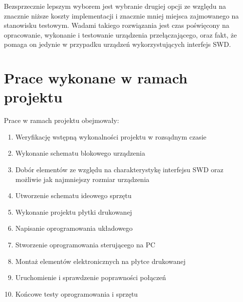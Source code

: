 Bezsprzecznie lepszym wyborem jest wybranie drugiej opcji ze względu na znacznie niższe koszty implementacji i znacznie mniej miejsca zajmowanego na stanowisku testowym. Wadami takiego rozwiązania jest czas poświęcony na opracowanie, wykonanie i testowanie urządzenia przełączającego, oraz fakt, że pomaga on jedynie w przypadku urządzeń wykorzystujących interfejs SWD.

\section{Prace wykonane w ramach projektu}
Prace w ramach projektu obejmowały:
\begin{enumerate}
    \item Weryfikację wstępną wykonalności projektu w rozsądnym czasie
    \item Wykonanie schematu blokowego urządzenia
    \item Dobór elementów ze względu na charakterystykę interfejsu SWD oraz możliwie jak najmniejszy rozmiar urządzenia
    \item Utworzenie schematu ideowego sprzętu
    \item Wykonanie projektu płytki drukowanej
    \item Napisanie oprogramowania układowego
    \item Stworzenie oprogramowania sterującego na PC
    \item Montaż elementów elektronicznych na płytce drukowanej
    \item Uruchomienie i sprawdzenie poprawności połączeń
    \item Końcowe testy oprogramowania i sprzętu
\end{enumerate}


